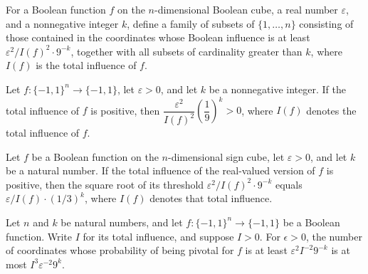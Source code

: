 \begin{definition}
\label{FABL.theorem9_28Family}
\leanok
{}
For a Boolean function $f$ on the $n$-dimensional Boolean cube, a real number
$\varepsilon$, and a nonnegative integer $k$, define a family of subsets of
$\{1,\ldots,n\}$ consisting of those contained in the coordinates whose Boolean
influence is at least $\varepsilon^2/I(f)^2\cdot 9^{-k}$, together with all subsets of
cardinality greater than $k$, where $I(f)$ is the total influence of $f$.
\end{definition}

\begin{theorem}
\label{FABL.theorem9_28Threshold_pos}
\leanok
{}
Let $f:\{-1,1\}^n\to\{-1,1\}$, let $\varepsilon>0$, and let $k$ be a nonnegative
integer. If the total influence of $f$ is positive, then
$\dfrac{\varepsilon^2}{I(f)^2}\left(\dfrac{1}{9}\right)^k>0$, where $I(f)$ denotes the
total influence of $f$.
\end{theorem}

\begin{theorem}
\label{FABL.sqrt_theorem9_28Threshold}
\leanok
{}
Let $f$ be a Boolean function on the $n$-dimensional sign cube, let $\varepsilon>0$, and
let $k$ be a natural number. If the total influence of the real-valued version of $f$ is
positive, then the square root of its threshold $\varepsilon^2/I(f)^2\cdot 9^{-k}$
equals $\varepsilon/I(f)\cdot(1/3)^k$, where $I(f)$ denotes that total influence.
\end{theorem}

\begin{theorem}
\label{FABL.card_theorem9_28_influentialCoordinates_le}
\leanok
{}
Let $n$ and $k$ be natural numbers, and let $f:\{-1,1\}^n\to\{-1,1\}$ be a Boolean
function. Write $I$ for its total influence, and suppose $I>0$. For $\epsilon>0$, the
number of coordinates whose probability of being pivotal for $f$ is at least
$\varepsilon^2 I^{-2}9^{-k}$ is at most $I^3\varepsilon^{-2}9^k$.
\end{theorem}

